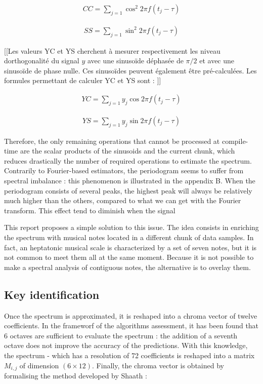 \documentclass[letterpaper]{article}
\begin{document}
\begin{align}
CC = \sum\limits_{j=1} \cos^{2} 2\pi f (t_{j} - \tau)
\label{fig:cc}
\end{align}

\begin{align}
SS = \sum\limits_{j=1} \sin^{2} 2\pi f (t_{j} - \tau)
\label{fig:ss}
\end{align}

[[Les valeurs YC et YS cherchent à mesurer respectivement les niveau d\textquotesingle orthogonalité du signal $y$ avec une sinusoïde déphasée de $\pi / 2$ et avec une sinusoïde de phase nulle. Ces sinusoïdes peuvent également être pré-calculées. Les formules permettant de calculer YC et YS sont : ]]

\begin{align}
YC = \sum\limits_{j=1} y_{j}\cos 2\pi f (t_{j} - \tau)
\end{align}

\begin{align}
YS = \sum\limits_{j=1} y_{j}\sin 2\pi f (t_{j} - \tau)
\end{align}

Therefore, the only remaining operations that cannot be processed at compile-time are the scalar products of the sinusoids and the current chunk, which
reduces drastically the number of required operations to estimate the spectrum.\\

Contrarily to Fourier-based
estimators, the periodogram seems to suffer from spectral imbalance : this phenomenon is illustrated in the appendix B. When the periodogram consists of several peaks, the highest peak will always be relatively much higher than the others, compared to what we can get with the Fourier transform. This effect tend to diminish when the signal 

This report proposes a simple solution to this issue. The idea consists in enriching the spectrum with musical notes located in a different chunk of data samples. In fact, an heptatonic musical scale is characterized by a set of seven notes, but it is
not common to meet them all at the same moment. Because it is not possible to make a spectral analysis of contiguous notes, the alternative is to overlay them.

\subsection{Key identification}

Once the spectrum is approximated, it is reshaped into a chroma vector of twelve coefficients. In the frameworf of the algorithms assessment, it has been found that 6 octaves are sufficient to evaluate the spectrum : the addition of a seventh octave does not improve the accuracy of the predictions. With this knowledge, the spectrum - which has a resolution of 72 coefficients is reshaped into a matrix $M_{i, j}$ of dimension $(6 \times 12)$. Finally, the chroma vector is obtained by formalising the method developed by Sha\textquotesingle ath :
\end{document}
